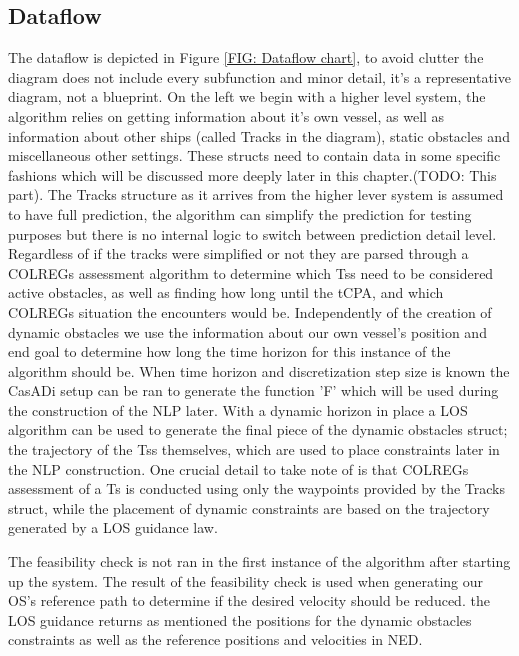 \subsection{Dataflow}

The dataflow is depicted in Figure \ref{FIG: Dataflow chart}, to avoid clutter the diagram does not include every subfunction and minor detail, it's a
representative diagram, not a blueprint. On the left we begin with a higher level system, the algorithm
relies on getting information about it's own vessel, as well as information about other ships (called Tracks in the diagram), static obstacles and miscellaneous
other settings. These structs need to contain data in some specific fashions which will be discussed more deeply later in this chapter.(TODO: This part).
The Tracks structure as it arrives from the higher lever system is assumed to have full prediction, the algorithm can simplify the prediction
for testing purposes but there is no internal logic to switch between prediction detail level. Regardless of if the tracks were simplified or not
they are parsed through a \gls{COLREGs} assessment algorithm  to determine which \gls{Ts}s need to be considered active obstacles, as well as
finding how long until the \gls{tCPA}, and which \gls{COLREGs} situation the encounters would be.
Independently of the creation of dynamic obstacles we use the information about our own vessel's position and end goal
to determine how long the time horizon for this instance of the algorithm should be. When time horizon and discretization step size
is known the CasADi setup can be ran to generate the function 'F' which will be used during the construction of the \gls{NLP} later.
With a dynamic horizon in place a LOS algorithm can be used to generate the final piece of the dynamic obstacles struct; the trajectory of the \gls{Ts}s
themselves, which are used to place constraints later in the \gls{NLP} construction. One crucial detail to take note of is that COLREGs assessment of a \gls{Ts}
is conducted using only the waypoints provided by the Tracks struct, while the placement of dynamic constraints are based on the trajectory generated by a LOS
guidance law. 

The feasibility check is not ran in the first instance of the algorithm after starting up the system. The result of the feasibility check
is used when generating our \gls{OS}'s reference path to determine if the desired velocity should be reduced. the LOS guidance
returns as mentioned the positions for the dynamic obstacles constraints as well as the reference positions and velocities in NED.

